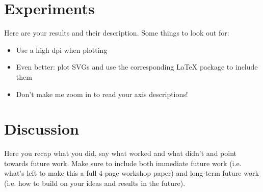 \documentclass{article}
\begin{document}
\section{Experiments}
Here are your results and their description. Some things to look out for:
\begin{itemize}
    \item Use a high dpi when plotting
    \item Even better: plot SVGs and use the corresponding LaTeX package to include them
    \item Don't make me zoom in to read your axis descriptions!
\end{itemize}

\section{Discussion}
Here you recap what you did, say what worked and what didn't and point towards future work.
Make sure to include both immediate future work (i.e. what's left to make this a full 4-page workshop paper) and long-term future work (i.e. how to build on your ideas and results in the future).

\newpage



\newpage
\end{document}
